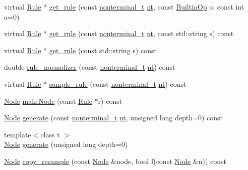 \begin{DoxyCompactItemize}
\item 
virtual \hyperlink{class_rule}{Rule} $\ast$ \hyperlink{class_grammar_ab82ed6614e4fcced4d0e7c742e1c5e4b}{get\+\_\+rule} (const \hyperlink{_nonterminal_8h_a5c1f658dc7560600a16d22408bd716ca}{nonterminal\+\_\+t} \hyperlink{class_grammar_aa5c9afa0e7e1aa989b54402b02a677a3}{nt}, const \hyperlink{_instruction_8h_af2fb7c87c5854c5733d7bb0506b06de7}{Builtin\+Op} o, const int a=0)
\item 
virtual \hyperlink{class_rule}{Rule} $\ast$ \hyperlink{class_grammar_ae0198e1a6c052fad5cba950e0ad60d67}{get\+\_\+rule} (const \hyperlink{_nonterminal_8h_a5c1f658dc7560600a16d22408bd716ca}{nonterminal\+\_\+t} \hyperlink{class_grammar_aa5c9afa0e7e1aa989b54402b02a677a3}{nt}, const std\+::string s) const
\item 
virtual \hyperlink{class_rule}{Rule} $\ast$ \hyperlink{class_grammar_adecdec03b3211bd3b6800511c7ed5dd9}{get\+\_\+rule} (const std\+::string s) const
\item 
double \hyperlink{class_grammar_a2182b3ded5171ba3e84be952176798e9}{rule\+\_\+normalizer} (const \hyperlink{_nonterminal_8h_a5c1f658dc7560600a16d22408bd716ca}{nonterminal\+\_\+t} \hyperlink{class_grammar_aa5c9afa0e7e1aa989b54402b02a677a3}{nt}) const
\item 
virtual \hyperlink{class_rule}{Rule} $\ast$ \hyperlink{class_grammar_a50c30e020e54743d5ede0ca9469fdb91}{sample\+\_\+rule} (const \hyperlink{_nonterminal_8h_a5c1f658dc7560600a16d22408bd716ca}{nonterminal\+\_\+t} \hyperlink{class_grammar_aa5c9afa0e7e1aa989b54402b02a677a3}{nt}) const
\item 
\hyperlink{class_node}{Node} \hyperlink{class_grammar_a5d60795be5b288d74a87f2cc52008f71}{make\+Node} (const \hyperlink{class_rule}{Rule} $\ast$r) const
\item 
\hyperlink{class_node}{Node} \hyperlink{class_grammar_a6a08c44dbbba7406d3638bdc549fddad}{generate} (const \hyperlink{_nonterminal_8h_a5c1f658dc7560600a16d22408bd716ca}{nonterminal\+\_\+t} \hyperlink{class_grammar_aa5c9afa0e7e1aa989b54402b02a677a3}{nt}, unsigned long depth=0) const
\item 
{\footnotesize template$<$class t $>$ }\\\hyperlink{class_node}{Node} \hyperlink{class_grammar_aee4cda199ab92f79b55e73f6cbd90c8b}{generate} (unsigned long depth=0)
\item 
\hyperlink{class_node}{Node} \hyperlink{class_grammar_ad6333cce88a2fe7ce56a897a6a930c28}{copy\+\_\+resample} (const \hyperlink{class_node}{Node} \&node, bool f(const \hyperlink{class_node}{Node} \&n)) const

\end{DoxyCompactItemize}
